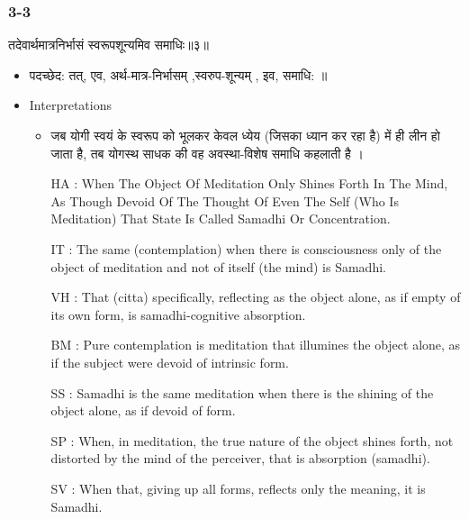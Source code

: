 \begin{frame}[fragile]\frametitle{3-3}
\begin{sanskrit}
तदेवार्थमात्रनिर्भासं स्वरूपशून्यमिव समाधिः॥३॥
\end{sanskrit}

	\begin{itemize}
	\item पदच्छेद: तत्, एव, अर्थ-मात्र-निर्भासम् ,स्वरुप-शून्यम् , इव, समाधि: ॥
	\item Interpretations
		\begin{itemize}	
		\item जब योगी स्वयं के स्वरूप को भूलकर केवल ध्येय (जिसका ध्यान कर रहा है) में ही लीन हो जाता है, तब योगस्थ साधक की वह अवस्था-विशेष समाधि कहलाती है ।
		\item [HA]: When The Object Of Meditation Only Shines Forth In The Mind, As Though Devoid Of The Thought Of Even The Self (Who Is Meditation) That State Is Called Samadhi Or Concentration.
		\item [IT]: The same (contemplation) when there is consciousness only of the object of meditation and not of itself (the mind) is Samadhi.
		\item [VH]: That (citta) specifically, reflecting as the object alone, as if empty of its own form, is samadhi-cognitive absorption.
		\item [BM]: Pure contemplation is meditation that illumines the object alone, as if the subject were devoid of intrinsic form.
		\item [SS]: Samadhi is the same meditation when there is the shining of the object alone, as if devoid of form.
		\item [SP]: When, in meditation, the true nature of the object shines forth, not distorted by the mind of the perceiver, that is absorption (samadhi).
		\item [SV]: When that, giving up all forms, reflects only the meaning, it is Samadhi. 
		\end{itemize}
	\end{itemize}
\end{frame}



